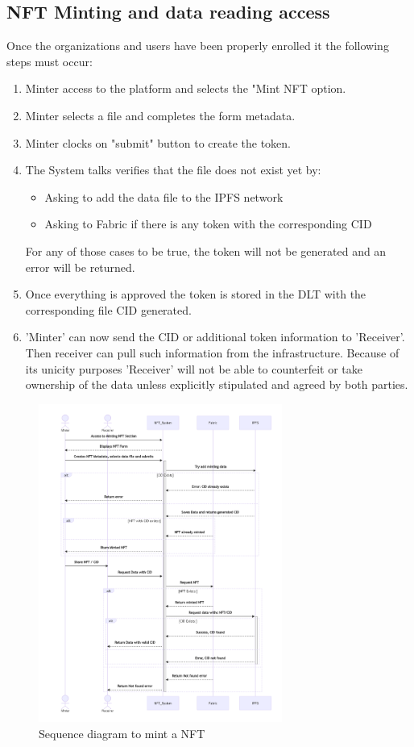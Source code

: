 \documentclass[a4paper]{article}
\begin{document}
\subsection{NFT Minting and data reading access}
Once the organizations and users have been properly enrolled it the following steps must occur:
\begin{enumerate}
    \item Minter access to the platform and selects the "Mint 
    NFT option.
    \item Minter selects a file and completes the form metadata.
    \item Minter clocks on "submit" button to create the token.
    \item The System talks verifies that the file does not exist yet by:
    \begin{itemize}
        \item Asking to add the data file to the IPFS network
        \item Asking to Fabric if there is any token with the corresponding CID
    \end{itemize}
    For any of those cases to be true, the token will not be generated and an error will be returned.
    \item Once everything is approved the token is stored in the DLT with the corresponding file CID generated.
    \item 'Minter' can now send the CID or additional token information to 'Receiver'. Then receiver can pull such information from the infrastructure. Because of its unicity purposes 'Receiver' will not be able to counterfeit or take ownership of the data unless explicitly stipulated and agreed by both parties.
\end{enumerate}

 \begin{figure}[ht]
        \includegraphics[width=8cm]{img/SequenceDiagram_MintNFT.png}
        \caption{Sequence diagram to mint a NFT}
        \label{fig:SeqDiag_Mint}
    \end{figure}
    
\end{document}
